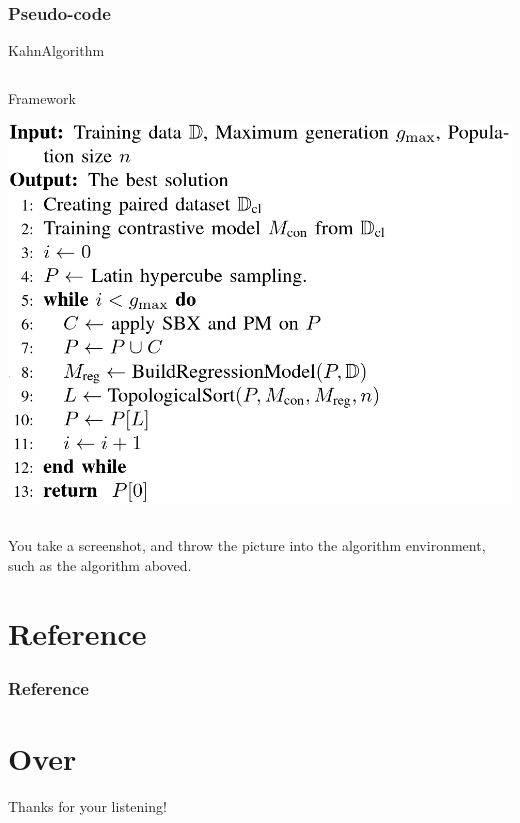 \documentclass[
    10pt,
    pdf,
    UTF8,
    aspectratio=169
]{beamer}
\begin{document}
\begin{frame}[allowframebreaks]
    \frametitle{Pseudo-code}
    \begin{algorithm}[H]
        \scriptsize
        \caption{KahnAlgorithm}
        \label{algo:kaha}
        
    \end{algorithm}
    \begin{columns}
        \begin{column}{0.65\textwidth}
            \begin{algorithm}[H]
                \scriptsize
                \caption{Framework}
                \label{aglo:figure}
                \includegraphics[width=\textwidth]{./algo/figure.png}
            \end{algorithm}
        \end{column}
    \end{columns}
    \hspace{2em} You take a screenshot, and throw the picture into the algorithm environment, such as the algorithm aboved.
\end{frame}


\section*{Reference}
\begin{frame}[allowframebreaks]
    \frametitle{Reference}
    \printbibliography
\end{frame}
  
\section*{Over}
\begin{frame}{}
    \centering
    \huge
    Thanks for your listening!
\end{frame}
\end{document}
